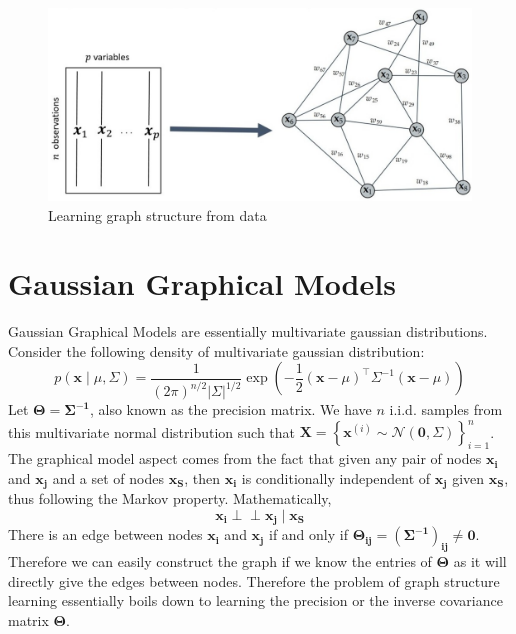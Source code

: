 \begin{center}
	\begin{figure}[htpb]
		\includegraphics[scale=0.45]{Pictures/data.eps}
		\caption{Learning graph structure from data  }
		\label{fig:graph-from-data}
	\end{figure}
\end{center} 

\section{Gaussian Graphical Models}
Gaussian Graphical Models are essentially multivariate gaussian distributions. Consider the following density of multivariate gaussian distribution:
\begin{equation}
p(\mathbf{x} \mid \mu, \Sigma)=\frac{1}{(2 \pi)^{n / 2}|\Sigma|^{1 / 2}} \exp \left(-\frac{1}{2}(\mathbf{x}-\mu)^{\top} \Sigma^{-1}(\mathbf{x}-\mu)\right)
\end{equation}
Let $\mathbf{\Theta = \Sigma^{-1}}$, also known as the precision matrix. We have $n$ i.i.d. samples from this multivariate normal distribution such that $\mathbf{X} = \left\{\mathbf{x}^{(i)} \sim \mathcal{N}\left(\mathbf{0}, \Sigma\right)\right\}_{i=1}^{n}$. The graphical model aspect comes from the fact that given any pair of nodes $\mathbf{x_i}$ and $\mathbf{x_j}$ and a set of nodes $\mathbf{x_S}$, then $\mathbf{x_i}$ is conditionally independent of $\mathbf{x_j}$ given $\mathbf{x_S}$, thus following the Markov property. Mathematically, $$\mathbf{x_i \perp \!\!\! \perp  x_j \mid x_{S}}$$ There is an edge between nodes $\mathbf{x_i}$ and $\mathbf{x_j}$ if and only if $\mathbf{\Theta_{ij} = (\Sigma^{-1})_{ij} \ne 0}$. Therefore we can easily construct the graph if we know the entries of $\mathbf{\Theta}$ as it will directly give the edges between nodes. Therefore the problem of graph structure learning essentially boils down to learning the precision or the inverse covariance matrix $\mathbf{\Theta}$.

